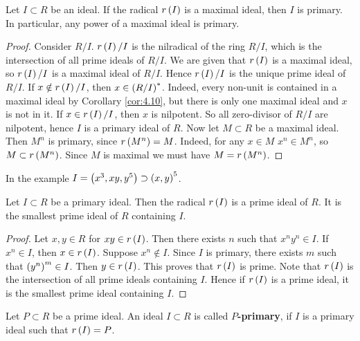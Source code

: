 \begin{proposition}
Let $ I \subset R $ be an ideal. If the radical $ r\left( I \right) $ is a maximal ideal, then $ I $ is primary. In particular, any power of a maximal ideal is primary.
\end{proposition}

\begin{proof}
Consider $ R / I $. $ r\left( I \right) / I $ is the nilradical of the ring $ R / I $, which is the intersection of all prime ideals of $ R / I $. We are given that $ r\left( I \right) $ is a maximal ideal, so $ r\left( I \right) / I $ is a maximal ideal of $ R / I $. Hence $ r\left( I \right) / I $ is the unique prime ideal of $ R / I $. If $ x \notin r\left( I \right) / I $, then $ x \in \left( R / I \right)^* $. Indeed, every non-unit is contained in a maximal ideal by Corollary \ref{cor:4.10}, but there is only one maximal ideal and $ x $ is not in it. If $ x \in r\left( I \right) / I $, then $ x $ is nilpotent. So all zero-divisor of $ R / I $ are nilpotent, hence $ I $ is a primary ideal of $ R $. Now let $ M \subset R $ be a maximal ideal. Then $ M^n $ is primary, since $ r\left( M^n \right) = M $. Indeed, for any $ x \in M $ $ x^n \in M^n $, so $ M \subset r\left( M^n \right) $. Since $ M $ is maximal we must have $ M = r\left( M^n \right) $.
\end{proof}

\begin{example*}
In the example $ I = \left( x^3, xy, y^5 \right) \supset \left( x, y \right)^5 $.
\end{example*}

\begin{proposition}
\label{prop:11.3}
Let $ I \subset R $ be a primary ideal. Then the radical $ r\left( I \right) $ is a prime ideal of $ R $. It is the smallest prime ideal of $ R $ containing $ I $.
\end{proposition}

\begin{proof}
Let $ x, y \in R $ for $ xy \in r\left( I \right) $. Then there exists $ n $ such that $ x^ny^n \in I $. If $ x^n \in I $, then $ x \in r\left( I \right) $. Suppose $ x^n \notin I $. Since $ I $ is primary, there exists $ m $ such that $ \left( y^n \right)^m \in I $. Then $ y \in r\left( I \right) $. This proves that $ r\left( I \right) $ is prime. Note that $ r\left( I \right) $ is the intersection of all prime ideals containing $ I $. Hence if $ r\left( I \right) $ is a prime ideal, it is the smallest prime ideal containing $ I $.
\end{proof}

\begin{definition}
Let $ P \subset R $ be a prime ideal. An ideal $ I \subset R $ is called \textbf{$ P $-primary}, if $ I $ is a primary ideal such that $ r\left( I \right) = P $.
\end{definition}

